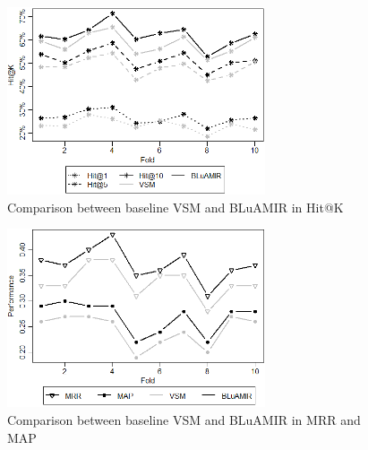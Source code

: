 \documentclass[conference]{IEEEtran}
\begin{document}
%	

\begin{figure}
	\centering
	\includegraphics[width=3in]{hitk-vsm-proposed}
		\vspace{-.3cm}
	\caption {Comparison between baseline VSM and BLuAMIR in Hit@K}
	\label{fig:VSM+AssoTopK}
	\vspace{-.3cm}
\end{figure}

\begin{figure}
	\centering
	\includegraphics[width=3in]{mrr-map-vsm-proposed}
		\vspace{-.3cm}
	\caption {Comparison between baseline VSM and BLuAMIR in MRR and MAP}
	\label{fig:VSM+AssoTop-MRR-MAP}
	\vspace{-.3cm}
\end{figure}
\end{document}
